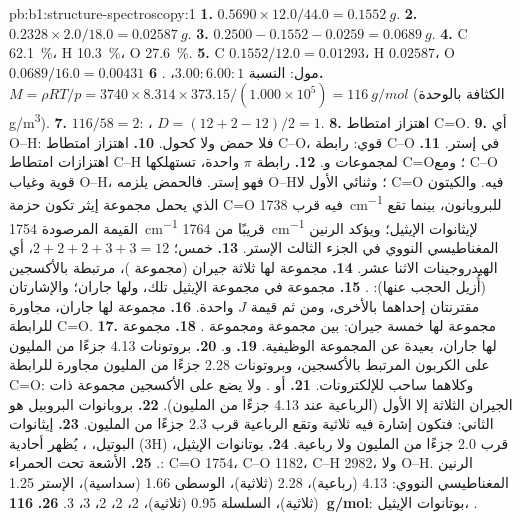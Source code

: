\begin{solution}{pb:b1:structure-spectroscopy:1}
\textbf{1.} $0.5690 \times 12.0/44.0 = \qty{0.1552}{g}$.
\textbf{2.} $0.2328 \times 2.0/18.0 = \qty{0.02587}{g}$.
\textbf{3.} $0.2500 - 0.1552 - 0.0259 = \qty{0.0689}{g}$.
\textbf{4.} C \qty{62.1}{\percent}، H \qty{10.3}{\percent}، O
\qty{27.6}{\percent}.
\textbf{5.} C $0.1552/12.0 = 0.01293$، H $0.02587$، O $0.0689/16.0 =
0.00431$ مول: النسبة $3.00 : 6.00 : 1$، .
\textbf{6.} $M = \rho RT/p = 3740 \times 8.314 \times 373.15/(1.000 \times 10^5) =
\qty{116}{g/mol}$ (الكثافة بالوحدة \unit{g/m^3}).
\textbf{7.} $116/58 = 2$: ، $D = (12 + 2 - 12)/2 = 1$.
\textbf{8.} اهتزاز امتطاط C=O.
\textbf{9.} أي O--H: فلا حمض ولا كحول.
\textbf{10.} اهتزاز امتطاط C--O، قوي: رابطة C--O في إستر.
\textbf{11.} اهتزازات امتطاط C--H لمجموعات  و.
\textbf{12.} رابطة $\pi$ واحدة، تستهلكها C=O؛ ومع C--O قوية وغياب
O--H، فهو إستر. فالحمض يلزمه O--H؛ وثنائي الأول لا C=O فيه. والكيتون
الذي يحمل مجموعة إيثر تكون حزمة C=O فيه قرب \qty{1738}{cm^{-1}}
للبروبانون، بينما تقع القيمة المرصودة \qty{1754}{cm^{-1}} قريبًا من
\qty{1764}{cm^{-1}} لإيثانوات الإيثيل؛ ويؤكد الرنين المغناطيسي النووي في الجزء الثالث
الإستر.
\textbf{13.} خمس؛ $2 + 2 + 2 + 3 + 3 = 12$، أي الهيدروجينات الاثنا عشر.
\textbf{14.} مجموعة  لها ثلاثة جيران (مجموعة )، مرتبطة
بالأكسجين (أُزيل الحجب عنها): .
\textbf{15.} مجموعة  في مجموعة الإيثيل تلك، ولها جاران؛ والإشارتان
مقترنتان إحداهما بالأخرى، ومن ثم قيمة $J$ واحدة.
\textbf{16.} مجموعة  لها جاران، مجاورة للرابطة C=O.
\textbf{17.} مجموعة  لها خمسة جيران: بين مجموعة  ومجموعة
.
\textbf{18.} مجموعة  لها جاران، بعيدة عن المجموعة الوظيفية.
\textbf{19.}  و.
\textbf{20.} بروتونات 4.13 جزءًا من المليون على الكربون المرتبط بالأكسجين،
وبروتونات 2.28 جزءًا من المليون مجاورة للرابطة C=O: وكلاهما ساحب للإلكترونات.
\textbf{21.}  أو . ولا
يضع على الأكسجين مجموعة  ذات الجيران الثلاثة إلا الأول
(الرباعية عند 4.13 جزءًا من المليون).
\textbf{22.} بروبانوات البروبيل هو الثاني: فتكون إشارة  فيه
ثلاثية وتقع الرباعية قرب 2.3 جزءًا من المليون.
\textbf{23.} إيثانوات البوتيل، ، يُظهر أحادية (3H)
قرب 2.0 جزءًا من المليون ولا رباعية.
\textbf{24.} بوتانوات الإيثيل، .
\textbf{25.} الأشعة تحت الحمراء: C=O 1754، C--O 1182، C--H 2982، ولا O--H. الرنين المغناطيسي النووي: 
4.13 (رباعية)،  2.28 (ثلاثية)،  الوسطى 1.66 (سداسية)، 
الإستر 1.25 (ثلاثية)،  السلسلة 0.95 (ثلاثية)،  2، 2، 2، 3، 3.
\textbf{26.} \textbf{\qty{116}{g/mol}}: بوتانوات الإيثيل، .
\end{solution}
